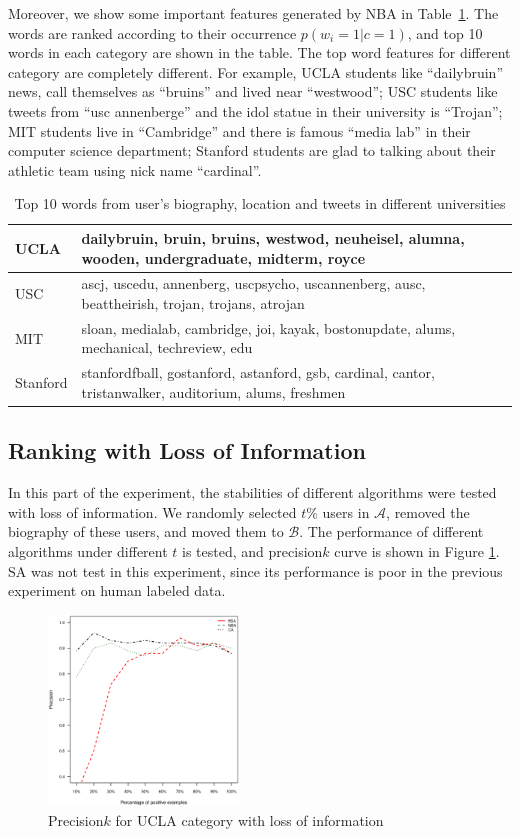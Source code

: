 \documentclass{article}
\begin{document}
Moreover, we show some important features generated by NBA in Table~\ref{tab:keyword}. The words are ranked according to their occurrence $p(w_i = 1 | c = 1)$, and top 10 words in each category are shown in the table. The top word features for different category are completely different. For example, UCLA students like ``dailybruin'' news, call themselves as ``bruins'' and lived near ``westwood''; USC students like tweets from ``usc annenberge'' and the idol statue in their university is ``Trojan''; MIT students live in ``Cambridge'' and there is famous ``media lab'' in their computer science department; Stanford students are glad to talking about their athletic team using nick name ``cardinal''.

\begin{table}[htbp]
\centering
\begin{tabular}{|l|l|}
\hline
UCLA & dailybruin, bruin, bruins, westwod, neuheisel, alumna, wooden, undergraduate, midterm, royce \\
\hline
USC & ascj, uscedu, annenberg, uscpsycho, uscannenberg, ausc, beattheirish, trojan, trojans, atrojan \\
\hline
MIT & sloan, medialab, cambridge, joi, kayak, bostonupdate, alums, mechanical, techreview, edu \\
\hline
Stanford & stanfordfball, gostanford, astanford, gsb, cardinal, cantor, tristanwalker, auditorium, alums, freshmen \\
\hline
\end{tabular}
\caption{Top 10 words from user's biography, location and tweets in different universities}\label{tab:keyword}
\end{table}

\subsection{Ranking with Loss of Information}
In this part of the experiment, the stabilities of different algorithms were tested with loss of information. We randomly selected $t\%$ users in $\mathcal{A}$, removed the biography of these users, and moved them to $\mathcal{B}$. The performance of different algorithms under different $t$ is tested, and precision\at$k$ curve is shown in Figure \ref{fig:e3}. SA was not test in this experiment, since its performance is poor in the previous experiment on human labeled data.

\begin{figure}[htbp]
\centering
\includegraphics[width=0.45\textwidth]{experiment/e2.ucla.eps}
\caption{Precision\at$k$ for UCLA category with loss of information}
\label{fig:e3}
\end{figure}
\end{document}

